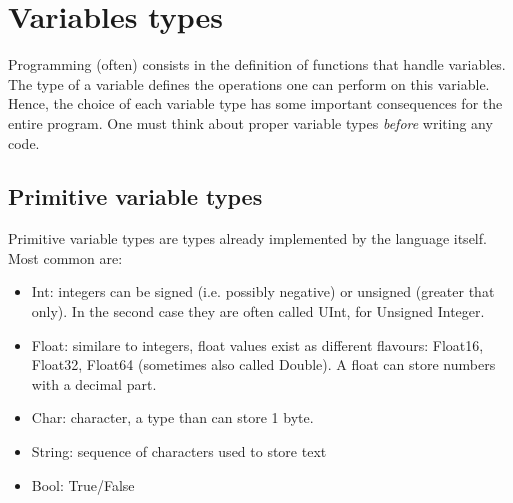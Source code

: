 \documentclass[11pt]{article}
\begin{document}
	\section{Variables types}
		Programming (often) consists in the definition of functions that handle variables.
		The type of a variable defines the operations one can perform on this variable.
		Hence, the choice of each variable type has some important consequences for the entire program. One must think about proper variable types  \emph{before} writing any code.

		\subsection{Primitive variable types}
			Primitive variable types are types already implemented by the language itself. Most common are:
			\begin{itemize}
				\item Int: integers can be signed (i.e. possibly negative) or unsigned (greater that only). In the second case they are often called UInt, for Unsigned Integer.
				\item Float: similare to integers, float values exist as different flavours: Float16, Float32, Float64 (sometimes also called Double). A float can store numbers with a decimal part.
				\item Char: character, a type than can store 1 byte.
				\item String: sequence of characters used to store text
				\item Bool: True/False
			\end{itemize}
\end{document}
